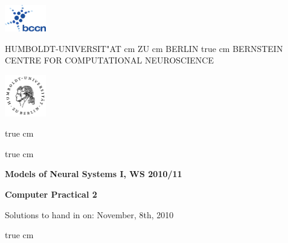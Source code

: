 \documentclass[12pt, a4]{article}
\begin{document}
\parbox{2cm}{
\includegraphics[width=1.8cm]{bccnlogo}
}
\parbox{11cm}{
\begin{center}
\large HUMBOLDT-UNIVERSIT"AT  cm ZU  cm BERLIN
 true cm
\mgross BERNSTEIN CENTRE FOR COMPUTATIONAL NEUROSCIENCE
\end{center}
}
\parbox{2cm}
{
\hfill
\includegraphics[width=1.8cm]{hublogo}
}

 true cm





 true cm
\centerline{\bf Models of Neural Systems I, WS 2010/11}
\centerline{\bf Computer Practical 2}
\centerline{Solutions to hand in on: November, 8th, 2010}


 true cm
\end{document}
